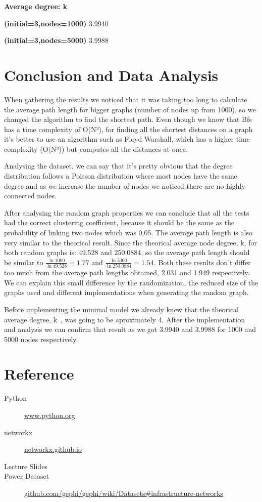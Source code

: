 \documentclass[a4paper,titlepage,11pt]{article}
\begin{document}
\begin{center}

  \textbf{Average degree: \textlangle k\textrangle}

  \textbf{(initial=3,nodes=1000)} 3.9940

  \textbf{(initial=3,nodes=5000)} 3.9988

\end{center}

\section{Conclusion and Data Analysis}
When gathering the results we noticed that it was taking too long to calculate the average path length for bigger graphs
(number of nodes up from 1000), so we changed the algorithm to find the shortest path. Even though we know that Bfs has a
time complexity of O(N²), for finding all the shortest distances on a graph it's better to use an algorithm such as Floyd Warshall,
which has a higher time complexity (O(N³)) but computes all the distances at once.

Analysing the dataset, we can say that it's pretty obvious that the degree distribution follows a Poisson distribution where most nodes
have the same degree and as we increase the number of nodes we noticed there are no highly connected nodes.

After analysing the random graph properties we can conclude that all the tests had the correct clustering coefficient, because it should
be the same as the probability of linking two nodes which was 0,05.
The average path length is also very similar to the theorical result. Since the theorical average node degree, \textlangle k\textrangle,
for both random graphs is: 49.528 and 250.0884, so the average path length should be similar to $\frac{\ln1000}{\ln49.528}=1.77$ and
$\frac{\ln5000}{\ln250.0884}=1.54$. Both these results don't differ too much from the average path lengths obtained, 2.031 and 1.949
respectively. We can explain this small difference by the randomization, the reduced size of the graphs used and different implementations
when generating the random graph.

Before implementing the minimal model we already knew that the theorical average degree, \textlangle k\textrangle \ , was going to be
aproximately 4. After the implementation and analysis we can confirm that result as we got 3.9940 and 3.9988 for 1000 and 5000 nodes respectively.

\section{Reference}
\begin{description}
  \item[Python] \href{https://www.python.org}{www.python.org}
  \item[networkx] \href{https://networkx.github.io}{networkx.github.io}
  \item[Lecture Slides]
  \item[Power Dataset] \href{https://github.com/gephi/gephi/wiki/Datasets#infrastructure-networks}{github.com/gephi/gephi/wiki/Datasets\#infrastructure-networks}

\end{description}
\end{document}
